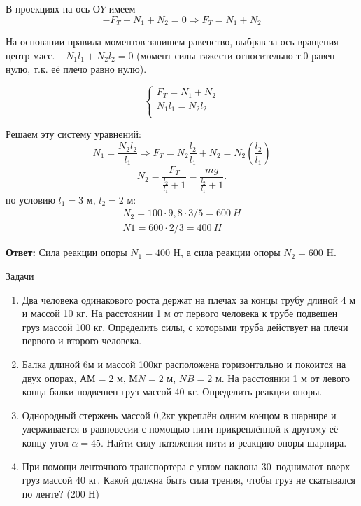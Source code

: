 \documentclass[a6paper, 11pt]{diss_4}
\renewcommand{\'}{\,'}
\begin{document}
В проекциях на ось $ОY$ имеем
\[
-F_T+N_1+N_2=0\Rightarrow
F_T=N_1+N_2
\]

На основании правила моментов запишем равенство, выбрав за ось вращения центр масс. $-N_1l_1+N_2l_2=0$ (момент силы тяжести относительно т.$0$ равен нулю, т.к. её плечо равно нулю).

\begin{equation*}
     \left\{
          \begin{array}{lr}
 F_T=N_1+N_2\\
 N_1l_1=N_2l_2\\
          \end{array}
     \right.
\end{equation*}

Решаем эту систему уравнений:
\[
N_1=\frac{N_2l_2}{l_1}\Rightarrow F_T=N_2\frac{l_2}{l_1}+N_2=N_2\left(\frac{l_2}{l_1}\right)
\]
\[
N_2=\frac{F_T}{\frac{l_2}{l_1}+1}=\frac{mg}{\frac{l_2}{l_1}+1}.
\]
по условию $l_1=3$ м, $l_2=2$ м:
\begin{gather*}
N_2=100\cdot9,8\cdot3/5=600\ H\\
N1=600\cdot2/3=400\ H
\end{gather*}


\textbf{Ответ:} Сила реакции опоры $N_1=400$ H, а сила реакции опоры $N_2=600$ H.

\begin{center}
   Задачи
\end{center}
\begin{enumerate}

\item Два человека одинакового роста держат на плечах за концы трубу длиной 4 м и массой 10 кг. На расстоянии 1 м от первого человека к трубе подвешен груз массой 100 кг. Определить силы, с которыми труба действует на плечи первого и второго человека.

\item Балка длиной 6м и массой 100кг расположена горизонтально и покоится на двух опорах, $АМ=2$ м, $МN=2$ м, $NB=2$ м. На расстоянии 1 м от левого конца балки подвешен груз массой 40 кг. Определить реакции опоры.

\item Однородный стержень массой 0,2кг укреплён одним концом в шарнире и удерживается в равновесии с помощью нити прикреплённой к другому её концу угол $\alpha=45$\textdegree. Найти силу натяжения нити и реакцию опоры шарнира.

\item При помощи ленточного транспортера с углом наклона 30\textdegree\ поднимают вверх груз массой 40 кг. Какой должна быть сила трения, чтобы груз не скатывался по ленте? (200 Н)

\end{enumerate}
\end{document}
